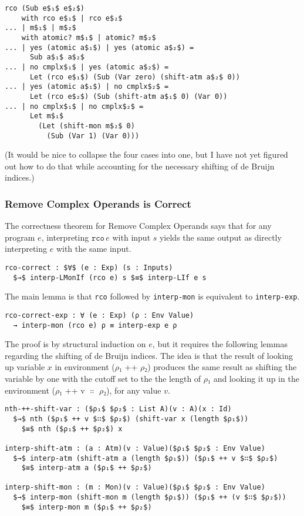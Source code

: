 \documentclass[sigplan,review,dvipsnames,screen,10pt]{acmart}
\begin{document}
\begin{lstlisting}
rco (Sub e$₁$ e$₂$)
    with rco e$₁$ | rco e$₂$
... | m$₁$ | m$₂$
    with atomic? m$₁$ | atomic? m$₂$
... | yes (atomic a$₁$) | yes (atomic a$₂$) =
      Sub a$₁$ a$₂$
... | no cmplx$₁$ | yes (atomic a$₂$) =
      Let (rco e$₁$) (Sub (Var zero) (shift-atm a$₂$ 0))
... | yes (atomic a$₁$) | no cmplx$₂$ =
      Let (rco e$₂$) (Sub (shift-atm a$₁$ 0) (Var 0))
... | no cmplx$₁$ | no cmplx$₂$ = 
      Let m$₁$
        (Let (shift-mon m$₂$ 0)
          (Sub (Var 1) (Var 0)))
\end{lstlisting}

(It would be nice to collapse the four cases into one, but I have not
yet figured out how to do that while accounting for the necessary
shifting of de Bruijn indices.)

\subsubsection{Remove Complex Operands is Correct}

The correctness theorem for Remove Complex Operands says that for any
program $e$, interpreting $\mathtt{rco}\,e$ with input $s$ yields the
same output as directly interpreting $e$ with the same input.

\begin{lstlisting}
rco-correct : $∀$ (e : Exp) (s : Inputs)
  $→$ interp-LMonIf (rco e) s $≡$ interp-LIf e s 
\end{lstlisting}

The main lemma is that \lstinline{rco} followed by
\lstinline{interp-mon} is equivalent to \lstinline{interp-exp}.

\begin{lstlisting}
rco-correct-exp : ∀ (e : Exp) (ρ : Env Value)
  → interp-mon (rco e) ρ ≡ interp-exp e ρ
\end{lstlisting}

The proof is by structural induction on $e$, but it requires the
following lemmas regarding the shifting of de Bruijn indices.
The idea is that the result of looking up variable $x$ in
environment ($ρ₁$ ++ $ρ₂$) produces the same result as
shifting the variable by one with the cutoff set to the
the length of $ρ₁$ and looking it up in the environment
($ρ₁$ ++ v $∷$ $ρ₂$), for any value $v$.

\begin{lstlisting}
nth-++-shift-var : ($ρ₁$ $ρ₂$ : List A)(v : A)(x : Id)
  $→$ nth ($ρ₁$ ++ v $∷$ $ρ₂$) (shift-var x (length $ρ₁$))
    $≡$ nth ($ρ₁$ ++ $ρ₂$) x

interp-shift-atm : (a : Atm)(v : Value)($ρ₁$ $ρ₂$ : Env Value)
  $→$ interp-atm (shift-atm a (length $ρ₁$)) ($ρ₁$ ++ v $∷$ $ρ₂$) 
    $≡$ interp-atm a ($ρ₁$ ++ $ρ₂$) 

interp-shift-mon : (m : Mon)(v : Value)($ρ₁$ $ρ₂$ : Env Value)
  $→$ interp-mon (shift-mon m (length $ρ₁$)) ($ρ₁$ ++ (v $∷$ $ρ₂$))
    $≡$ interp-mon m ($ρ₁$ ++ $ρ₂$)
\end{lstlisting}
\end{document}
